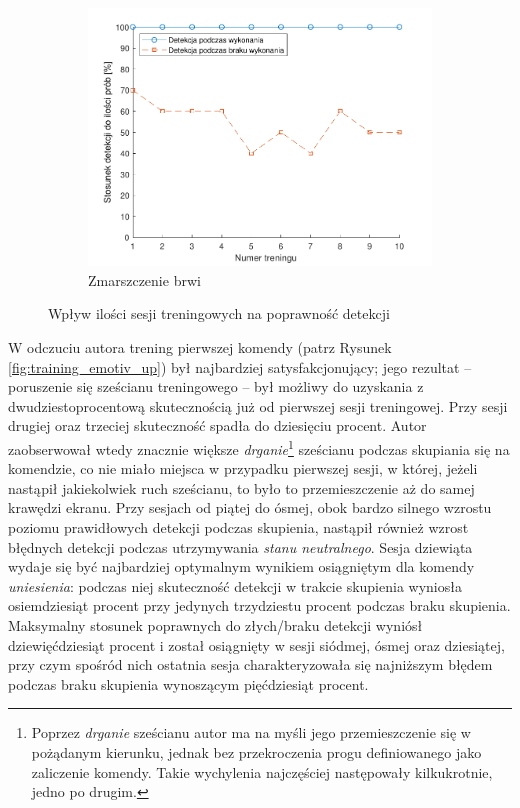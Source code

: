 \documentclass[skorowidz,skroty]{dyplomWEZUT}
\begin{document}
{\begin{figure}[htbp]
        \medskip
        \hspace*{\fill}\begin{subfigure}{0.49\textwidth}
        \includegraphics[width=\linewidth]{graphic/frown}
        \caption{Zmarszczenie brwi\label{fig:training_emotiv_frown}}
        \end{subfigure}\hspace*{\fill}
        
        \caption{Wpływ ilości sesji treningowych na poprawność detekcji\label{fig:training_emotiv}}
    \end{figure}
}

W odczuciu autora trening pierwszej komendy (patrz Rysunek \vref{fig:training_emotiv_up}) był najbardziej satysfakcjonujący; jego rezultat -- poruszenie się sześcianu treningowego -- był możliwy do uzyskania z dwudziestoprocentową skutecznością już od pierwszej sesji treningowej. Przy sesji drugiej oraz trzeciej skuteczność spadła do dziesięciu procent. Autor zaobserwował wtedy znacznie większe \textit{drganie}\footnote{Poprzez \textit{drganie} sześcianu autor ma na myśli jego przemieszczenie się w pożądanym kierunku, jednak bez przekroczenia progu definiowanego jako zaliczenie komendy. Takie wychylenia najczęściej następowały kilkukrotnie, jedno po drugim.} sześcianu podczas skupiania się na komendzie, co nie miało miejsca w przypadku pierwszej sesji, w której, jeżeli nastąpił jakiekolwiek ruch sześcianu, to było to przemieszczenie aż do samej krawędzi ekranu. Przy sesjach od piątej do ósmej, obok bardzo silnego wzrostu poziomu prawidłowych detekcji podczas skupienia, nastąpił również wzrost błędnych detekcji podczas utrzymywania \textit{stanu neutralnego}. Sesja dziewiąta wydaje się być najbardziej optymalnym wynikiem osiągniętym dla komendy \textit{uniesienia}: podczas niej skuteczność detekcji w trakcie skupienia wyniosła osiemdziesiąt procent przy jedynych trzydziestu procent podczas braku skupienia. Maksymalny stosunek poprawnych do złych/braku detekcji wyniósł dziewięćdziesiąt procent i został osiągnięty w sesji siódmej, ósmej oraz dziesiątej, przy czym spośród nich ostatnia sesja charakteryzowała się najniższym błędem podczas braku skupienia wynoszącym pięćdziesiąt procent.
\end{document}
